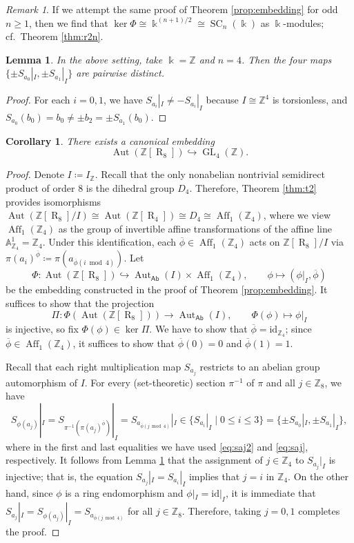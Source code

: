 \documentclass[12 pt]{amsart}
\newtheorem{corollary}[theorem]{Corollary}
\newtheorem{lemma}[theorem]{Lemma}
\theoremstyle{definition}
\theoremstyle{remark}
\newtheorem{remark}[theorem]{Remark}
\numberwithin{equation}{section}
\newcommand{\Aut}{\operatorname{Aut}}
\newcommand{\R}{\operatorname{R}}
\newcommand{\GL}{\operatorname{GL}}
\newcommand{\Aff}{\operatorname{Aff}}
\newcommand{\SC}{\operatorname{SC}}
\newcommand{\Z}{\mathbb{Z}}
\newcommand{\id}{\mathrm{id}}
\newcommand{\inv}{^{-1}}
\renewcommand{\k}{\Bbbk}
\begin{document}
\begin{remark}
    If we attempt the same proof of Theorem \ref{prop:embedding} for odd $n\geq 1$, then we find that $\ker\Phi\cong\k^{(n+1)/2}\cong\SC_n(\k)$ as $\k$-modules; cf.\ Theorem \ref{thm:r2n}.
\end{remark}

\begin{lemma}\label{lem:injective}
    In the above setting, take $\k=\Z$ and $n=4$. Then the four maps $\{\pm S_{a_0}|_I,\pm S_{a_1}|_I\}$ are pairwise distinct.
\end{lemma}

\begin{proof}
    For each $i=0,1$, we have $S_{a_i}|_I\neq-S_{a_i}|_I$ because $I\cong\Z^4$ is torsionless, and $S_{a_0}(b_0)=b_0\neq \pm b_2=\pm S_{a_1}(b_0)$.
\end{proof}

\begin{corollary}
    There exists a canonical embedding
    \[
    \Aut(\Z[\R_8])\hookrightarrow\GL_4(\Z).
    \]
\end{corollary}

\begin{proof}
    Denote $I\coloneq I_\Z$. Recall that the only nonabelian nontrivial semidirect product of order $8$ is the dihedral group $D_4$. Therefore, Theorem \ref{thm:t2} provides isomorphisms $\Aut(\Z[\R_8]/I)\cong\Aut(\Z[\R_4])\cong D_4\cong\Aff_1(\Z_4)$, where we view $\Aff_1(\Z_4)$ as the group of invertible affine transformations of the affine line $\mathbb A^1_{\Z_4}=\Z_4$.  
    Under this identification, each $\overline\phi\in\Aff_1(\Z_4)$ acts on $\Z[\R_8]/I$ via $\pi(a_i)^{\overline\phi}\coloneq\pi(a_{\overline\phi(i\bmod4)})$. 
    Let \[\Phi\colon \Aut(\Z[\R_8])\hookrightarrow \Aut_{\mathsf{Ab}}(I)\times\Aff_1(\Z_4),\qquad \phi\mapsto(\phi|_I,\overline\phi)\] be the embedding constructed in the proof of Theorem \ref{prop:embedding}. It suffices to show that the projection
    \[
    \Pi\colon\Phi(\Aut(\Z[\R_8]))\to \Aut_{\mathsf{Ab}}(I),\qquad \Phi(\phi)\mapsto\phi|_I
    \]
    is injective, so fix $\Phi(\phi)\in\ker\Pi$. We have to show that $\overline\phi=\id_{\Z_4}$; since $\overline\phi\in\Aff_1(\Z_4)$, it suffices to show that $\overline{\phi}(0)=0$ and $\overline\phi(1)=1$. 

    Recall that each right multiplication map $S_{a_j}$ restricts to an abelian group automorphism of $I$. For every (set-theoretic) section $\pi\inv$ of $\pi$ and all $j\in\Z_8$, we have \[S_{\phi(a_j)}|_I=S_{\pi\inv(\pi(a_j)^{\overline\phi})}|_I=S_{a_{\overline\phi(j\bmod4)}}|_I\in\{S_{a_i}|_I\mid 0\leq i\leq 3\}=\{\pm S_{a_0}|_I,\pm S_{a_1}|_I\},\] 
    where in the first and last equalities we have used \eqref{eq:saj2} and \eqref{eq:saj}, respectively. It follows from Lemma \ref{lem:injective} that the assignment of $j\in\Z_4$ to $S_{a_j}|_I$ is injective; that is, the equation $S_{a_j}|_I=S_{a_i}|_I$ implies that $j=i$ in $\Z_4$. On the other hand, since $\phi$ is a ring endomorphism and $\phi|_I=\id|_I$, it is immediate that $S_{a_j}|_I=S_{\phi(a_j)}|_I=S_{a_{\overline\phi(j\bmod 4)}}$ for all $j\in\Z_8$. Therefore, taking $j=0,1$ completes the proof.
\end{proof}
\end{document}
